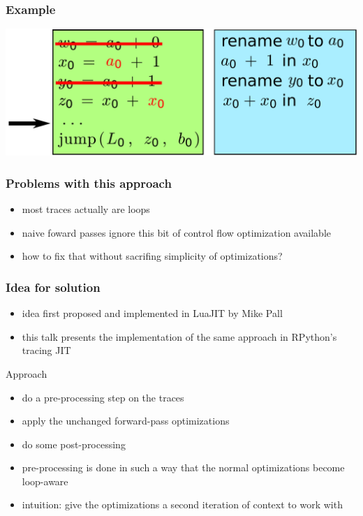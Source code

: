 \documentclass[utf8x]{beamer}
\begin{document}
\begin{frame}
  \frametitle{Example}
  \includegraphics[width=\columnwidth]{figures/optimization5}
\end{frame}


\begin{frame}
  \frametitle{Problems with this approach}
  \begin{itemize}
      \item most traces actually are loops
      \item naive foward passes ignore this bit of control flow optimization available
      \item how to fix that without sacrifing simplicity of optimizations?
  \end{itemize}
\end{frame}

\begin{frame}
  \frametitle{Idea for solution}
  \begin{itemize}
      \item idea first proposed and implemented in LuaJIT by Mike Pall
      \item this talk presents the implementation of the same approach in RPython's tracing JIT
  \end{itemize}
  \pause
  \begin{block}{Approach}
      \begin{itemize}
          \item do a pre-processing step on the traces
          \item apply the unchanged forward-pass optimizations
          \item do some post-processing
          \item pre-processing is done in such a way that the normal optimizations become loop-aware
          \pause
          \item intuition: give the optimizations a second iteration of context to work with
      \end{itemize}
  \end{block}
\end{frame}
\end{document}
